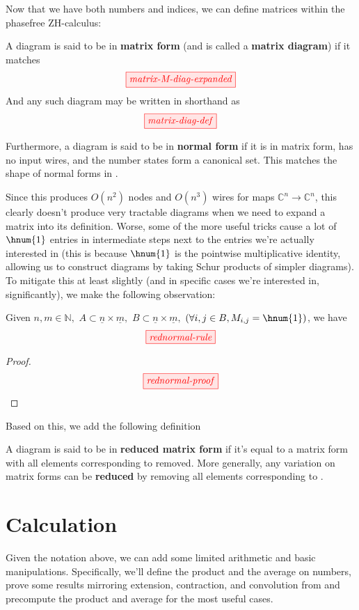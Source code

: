 Now that we have both numbers and indices, we can define matrices within the
phasefree ZH-calculus:
\begin{definition}\label{def:matrix-form}
    A diagram is said to be in \textbf{matrix form} (and is called a
    \textbf{matrix diagram}) if it matches
    $$\tikzfig{matrix-M-diag-expanded}$$
    And any such diagram may be written in shorthand as 
    $$\tikzfig{matrix-diag-def}$$

    Furthermore, a diagram is said to be in \textbf{normal form} if it is in
    matrix form, has no input wires, and the number states form a canonical set.
    This matches the shape of normal forms in \cite{backens2018zhcalculus}.
\end{definition}

Since this produces $O(n^2)$ nodes and $O(n^3)$ wires for maps $\mathbb{C}^n
\rightarrow \mathbb{C}^n$, this clearly doesn't produce very tractable diagrams
when we need to expand a matrix into its definition. Worse, some of the more
useful tricks cause a lot of $\hnum{1}$ entries in intermediate steps next to
the entries we're actually interested in (this is because $\hnum{1}$ is the
pointwise multiplicative identity, allowing us to construct diagrams by taking
Schur products of simpler diagrams). To mitigate this at least slightly (and in
specific cases we're interested in, significantly), we make the following
observation: 
\begin{lemma}
    Given $n,m \in \mathbb{N}, $
    $A \subset \underline{n} \times \underline{m},$
    $B \subset \underline{n} \times \underline{m},$
    $(\forall i,j \in B, M_{i,j} = \hnum{1})$, 
    we have 
    $$\tikzfig{rednormal-rule}$$
\end{lemma}
\begin{proof}
    $$\tikzfig{rednormal-proof}$$
\end{proof}

Based on this, we add the following definition
\begin{definition}
    A diagram is said to be in \textbf{reduced matrix form} if it's equal to a
    matrix form with all elements corresponding to  removed. More
    generally, any variation on matrix forms can be \textbf{reduced} by removing
    all elements corresponding to .
\end{definition}

\section{Calculation}\label{sec:calculation}
Given the notation above, we can add some limited arithmetic and basic
manipulations. Specifically, we'll define the product and the average on
numbers, prove some results mirroring extension, contraction, and convolution
from \cite{backens2018zhcalculus} and precompute the product and average for the
most useful cases.

